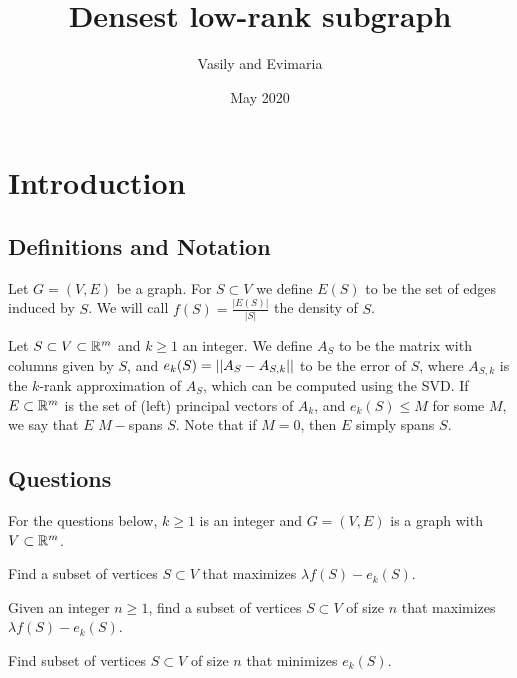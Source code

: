 \documentclass{article}
\title{Densest low-rank subgraph}
\author{Vasily and Evimaria}
\date{May 2020}
\begin{document}
\maketitle

\section{Introduction}
\subsection{Definitions and Notation}
\begin{definition}
Let $G = (V,E)$ be a graph. For $S\subset V$ we define $E(S)$ to be the set of edges induced by $S$. We will call $f(S) = \frac{|E(S)|}{|S|}$ the density of $S$.
\end{definition}

\begin{definition}
Let $S\subset V\subset \mathbb{R}^m$ and $k\geq 1$ an integer. We define $A_S$ to be the matrix with columns given by $S$, and $e_k(S) = ||A_S - A_{S,k}||$ to be the error of $S$, where $A_{S,k}$ is the $k$-rank approximation of $A_S$, which can be computed using the SVD. If $E\subset \mathbb{R}^m$ is the set of (left) principal vectors of $A_k$, and $e_k(S) \leq M$ for some $M$, we say that $E$ $M-$spans $S$. Note that if $M=0$, then $E$ simply spans $S$.
\end{definition}

\subsection{Questions}
For the questions below, $k \geq 1$ is an integer and $G = (V,E)$ is a graph with $V\subset \mathbb{R}^m$.
\begin{question}
    Find a subset of vertices $S\subset V$ that maximizes $\lambda f(S) - e_k(S)$.
\end{question}

\begin{question}
    Given an integer $n\geq 1$, find a subset of vertices $S\subset V$ of size $n$ that maximizes $\lambda f(S) - e_k(S)$.
\end{question}

\begin{question}
    Find subset of vertices $S\subset V$ of size $n$ that minimizes $e_k(S)$.
\end{question}
\end{document}
